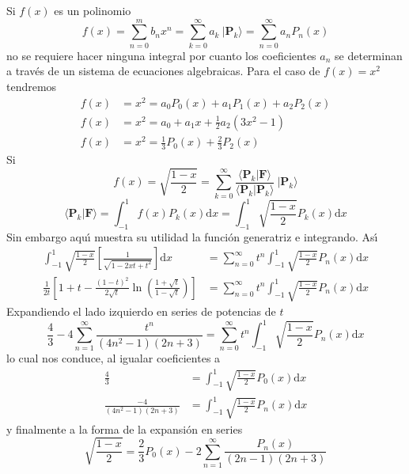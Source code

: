 \documentclass[spanish,notitlepage,letterpaper,12pt]{article}
\begin{document}
Si $f(x)$ es un polinomio
\[
f(x)=\sum_{n=0}^{m}b_{n}x^{n}=\sum_{k=0}^{\infty}a_{k}\ |\mathbf{P}_{k}%
\rangle=\sum_{n=0}^{\infty}a_{n}P_{n}(x)
\]
no se requiere hacer ninguna integral por cuanto los coeficientes $a_{n}$ se
determinan a trav\'{e}s de un sistema de ecuaciones algebraicas. Para el caso
de $f(x)=x^{2}$ tendremos
\begin{align*}
f(x)  & =x^{2}=a_{0}P_{0}(x)+a_{1}P_{1}(x)+a_{2}P_{2}(x)\\
f(x)  & =x^{2}=a_{0}+a_{1}x+\frac12a_{2}(3x^{2}-1)\\
f(x)  & =x^{2}=\frac13P_{0}(x)+\frac23P_{2}(x)
\end{align*}
Si
\[
f(x)=\sqrt{\frac{1-x}2}=\sum_{k=0}^{\infty}\frac{\langle\mathbf{P}%
_{k}|\mathbf{F}\rangle}{\langle\mathbf{P}_{k}|\mathbf{P}_{k}\rangle
}\ |\mathbf{P}_{k}\rangle
\]
\[
\langle\mathbf{P}_{k}|\mathbf{F}\rangle=\int_{-1}^{1}f(x)P_{k}(x)\mathrm{d}%
x=\int_{-1}^{1}\sqrt{\frac{1-x}2}P_{k}(x)\mathrm{d}x
\]
Sin embargo aqu\'{\i} muestra su utilidad la funci\'{o}n generatriz e
integrando. As\'{\i}
\begin{align*}%
{\displaystyle\int_{-1}^{1}}
\sqrt{\frac{1-x}2}\left[  \frac1{\sqrt{1-2xt+t^{2}}}\right]  \mathrm{d}x  &
=\sum_{n=0}^{\infty}t^{n}%
{\displaystyle\int_{-1}^{1}}
\sqrt{\frac{1-x}2}P_{n}(x)\mathrm{d}x\\
\frac1{2t}\left[  1+t-\frac{\left(  1-t\right)  ^{2}}{2\sqrt{t}}\ln\left(
\frac{1+\sqrt{t}}{1-\sqrt{t}}\right)  \right]   & =\sum_{n=0}^{\infty}t^{n}%
{\displaystyle\int_{-1}^{1}}
\sqrt{\frac{1-x}2}P_{n}(x)\mathrm{d}x
\end{align*}
Expandiendo el lado izquierdo en series de potencias de $t$%
\[
\frac43-4\sum_{n=1}^{\infty}\frac{t^{n}}{\left(  4n^{2}-1\right)  \left(
2n+3\right)  }=\sum_{n=0}^{\infty}t^{n}%
{\displaystyle\int_{-1}^{1}}
\sqrt{\frac{1-x}2}P_{n}(x)\mathrm{d}x
\]
lo cual nos conduce, al igualar coeficientes a
\begin{align*}
\frac43  & =%
{\displaystyle\int_{-1}^{1}}
\sqrt{\frac{1-x}2}P_{0}(x)\mathrm{d}x\\
\frac{-4}{\left(  4n^{2}-1\right)  \left(  2n+3\right)  }  & =%
{\displaystyle\int_{-1}^{1}}
\sqrt{\frac{1-x}2}P_{n}(x)\mathrm{d}x
\end{align*}
y finalmente a la forma de la expansi\'{o}n en series
\[
\sqrt{\frac{1-x}2}=\frac23P_{0}(x)-2\sum_{n=1}^{\infty}\frac{P_{n}(x)}{\left(
2n-1\right)  \left(  2n+3\right)  }
\]
\end{document}
